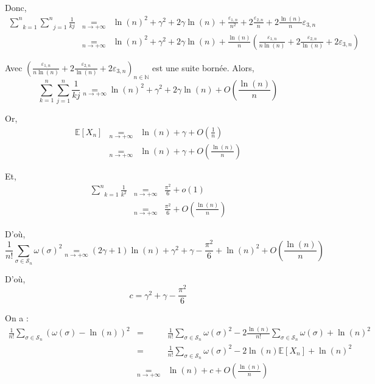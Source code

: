 Donc,
\begin{eqnarray*}
  \underset{k = 1}{\overset{n}{\sum}} \underset{j = 1}{\overset{n}{\sum}}
  \frac{1}{k j} & \underset{n \rightarrow + \infty}{=} & \ln (n)^2 + \gamma^2
  + 2 \gamma \ln (n) + \frac{\varepsilon_{1, n}}{n^2} + 2
  \frac{\varepsilon_{2, n}}{n} + 2 \frac{\ln (n)}{n} \varepsilon_{3, n}\\
  & \underset{n \rightarrow + \infty}{=} & \ln (n)^2 + \gamma^2 + 2 \gamma
  \ln (n) + \frac{\ln (n)}{n} \left( \frac{\varepsilon_{1, n}}{n \ln (n)} + 2
  \frac{\varepsilon_{2, n}}{\ln (n)} + 2 \varepsilon_{3, n} \right)
\end{eqnarray*}


Avec $\left( \frac{\varepsilon_{1, n}}{n \ln (n)} + 2 \frac{\varepsilon_{2,
n}}{\ln (n)} + 2 \varepsilon_{3, n} \right)_{n \in \mathbb{N}}$ est une suite
born{\'e}e. Alors,
\[ \underset{k = 1}{\overset{n}{\sum}} \underset{j = 1}{\overset{n}{\sum}}
   \frac{1}{k j} \underset{n \rightarrow + \infty}{=} \ln (n)^2 + \gamma^2 + 2
   \gamma \ln (n) + O \left( \frac{\ln (n)}{n} \right) \]


Or,
\begin{eqnarray*}
  \mathbb{E} [X_n] & \underset{n \rightarrow + \infty}{=} & \ln (n) + \gamma +
  O \left( \frac{1}{n} \right)\\
  & \underset{n \rightarrow + \infty}{=} & \ln (n) + \gamma + O \left(
  \frac{\ln (n)}{n} \right)
\end{eqnarray*}


Et,
\begin{eqnarray*}
  \underset{k = 1}{\overset{n}{\sum}} \frac{1}{k^2} & \underset{n \rightarrow
  + \infty}{=} & \frac{\pi^2}{6} + o (1)\\
  & \underset{n \rightarrow + \infty}{=} & \frac{\pi^2}{6} + O \left(
  \frac{\ln (n)}{n} \right)
\end{eqnarray*}


D'o{\`u},
\[ \frac{1}{n!} \underset{\sigma \in \mathcal{S}_n}{\sum} \omega (\sigma)^2
   \underset{n \rightarrow + \infty}{=} (2 \gamma + 1) \ln (n) + \gamma^2 +
   \gamma - \frac{\pi^2}{6} + \ln (n)^2 + O \left( \frac{\ln (n)}{n} \right)
\]


D'o{\`u},
\[ c = \gamma^2 + \gamma - \frac{\pi^2}{6} \]


 On a :
\begin{eqnarray*}
  \frac{1}{n!} \underset{\sigma \in \mathcal{S}_n}{\sum} (\omega (\sigma) -
  \ln (n))^2 & = & \frac{1}{n!} \underset{\sigma \in \mathcal{S}_n}{\sum}
  \omega (\sigma)^2 - 2 \frac{\ln (n)}{n!} \underset{\sigma \in
  \mathcal{S}_n}{\sum} \omega (\sigma) + \ln (n)^2\\
  & = & \frac{1}{n!} \underset{\sigma \in \mathcal{S}_n}{\sum} \omega
  (\sigma)^2 - 2 \ln (n) \mathbb{E} [X_n] + \ln (n)^2 \\
  & \underset{n \rightarrow + \infty}{=} & \ln (n) + c + O \left( \frac{\ln
  (n)}{n} \right)
\end{eqnarray*}


